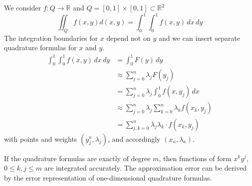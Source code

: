 \documentclass[a4paper]{article}
\numberwithin{lecref}{section}
\theoremstyle{break}
\begin{document}
We consider $f: Q \to \mathbb R$ and $Q = [0, 1] \times [0, 1] \subset \mathbb R^2$
\[ \iint_{Q} f(x, y) d(x, y) = \int_0^1 \int_0^1 f(x, y) \, dx \, dy \]
The integration boundaries for $x$ depend not on $y$ and we can insert separate quadrature formulas for $x$ and $y$.
\begin{align*}
  \int_0^1 \int_0^1 f(x, y) \, dx \, dy
    &= \int_0^1 F(y) \, dy \\
    &\approx \sum_{j=0}^n \lambda_j F(y_j) \\
    &= \sum_{j=0}^n \lambda_j \int_0^1 f(x, y_j) \, dx \\
    &\approx \sum_{j=0}^n \lambda_j \sum_{k=0}^n \lambda_k f(x_k, y_j) \\
    &= \sum_{j,k=0}^n \lambda_j \lambda_k \cdot f(x_k, y_j)
\end{align*}
with points and weights $(y_j^\kappa, \lambda_j)$, and accordingly $(x_\kappa, \lambda_\kappa)$.

If the quadrature formulas are exactly of degree $m$, then functions of form $x^k y^j$, $0 \leq k, j \leq m$ are integrated accurately. The approximation error can be derived by the error representation of one-dimensional quadrature formulas.



\printindex
\end{document}
